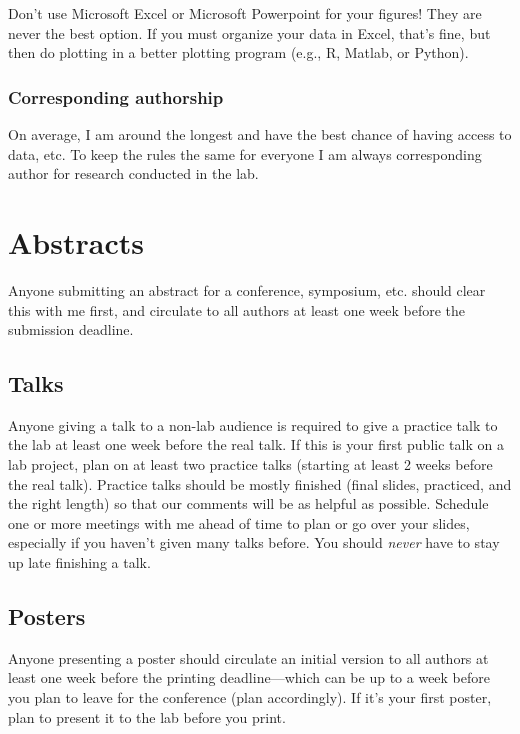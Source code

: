 \documentclass[letterpaper,12pt,oneside]{memoir}
\begin{document}
\begin{shaded}
\noindent Don't use Microsoft Excel or Microsoft Powerpoint for your figures! They are never the best option. If you must organize your data in Excel, that's fine, but then do plotting in a better plotting program (e.g., R, Matlab, or Python).
\end{shaded}


\subsubsection{Corresponding authorship}
On average, I am around the longest and have the best chance of having access to data, etc. To keep the rules the same for everyone I am always corresponding author for research conducted in the lab.



\section{Abstracts}
Anyone submitting an abstract for a conference, symposium, etc. should clear this with me first, and circulate to all authors at least one week before the submission deadline.

\subsection{Talks}
Anyone giving a talk to a non-lab audience is required to give a practice talk to the lab at least one week before the real talk. If this is your first public talk on a lab project, plan on at least two practice talks (starting at least 2 weeks before the real talk). Practice talks should be mostly finished (final slides, practiced, and the right length) so that our comments will be as helpful as possible. Schedule one or more meetings with me ahead of time to plan or go over your slides, especially if you haven't given many talks before. You should \textit{never} have to stay up late finishing a talk.

\subsection{Posters}
Anyone presenting a poster should circulate an initial version to all authors at least one week before the printing deadline---which can be up to a week before you plan to leave for the conference (plan accordingly). If it's your first poster, plan to present it to the lab before you print. 
\end{document}
